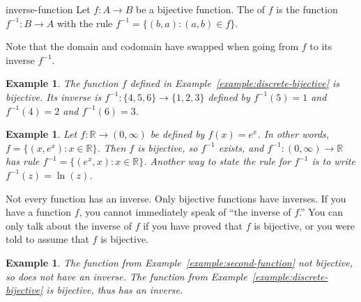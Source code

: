 \documentclass{book}
\newcounter{ekcounter}%
\theoremstyle{ekimcustom}
\newtheorem{example}[ekcounter]{Example}
\newcommand\defn[1]{{\color{blue}{\bf #1}}}
\begin{document}
\begin{bdefinition}{}{inverse-function}
Let $f : A \to B$ be a bijective function. The \defn{inverse function} of $f$ is the function $f^{-1} : B \to A$ with the rule $f^{-1} = \{(b,a) : (a,b) \in f\}$.
\end{bdefinition}
Note that the domain and codomain have swapped when going from $f$ to its inverse $f^{-1}$.

\begin{example}
The function $f$ defined in Example~\ref{example:discrete-bijective} is bijective. Its inverse is $f^{-1} : \{4,5,6\} \to \{1,2,3\}$ defined by $f^{-1}(5)=1$ and $f^{-1}(4)=2$ and $f^{-1}(6)=3$.
\end{example}
\begin{example}
Let $f : \mathbb{R} \to (0,\infty)$ be defined by $f(x) = e^x$. 
In other words, $f = \{(x,e^x) : x \in \mathbb{R}\}$.
Then $f$ is bijective, so $f^{-1}$ exists, and $f^{-1} : (0,\infty) \to \mathbb{R}$ has rule $f^{-1} = \{(e^x,x) : x \in \mathbb{R}\}$. Another way to state the rule for $f^{-1}$ is to write $f^{-1}(z) = \ln(z)$.
\end{example}


\begin{bwarning}{}{}
Not every function has an inverse. Only bijective functions have inverses. If you have a function $f$, you cannot immediately speak of ``the inverse of $f$.'' You can only talk about the inverse of $f$ if you have proved that $f$ is bijective, or you were told to assume that $f$ is bijective.
\end{bwarning}
\begin{example}
The function from Example~\ref{example:second-function} not bijective, so does not have an inverse.
The function from Example~\ref{example:discrete-bijective} is bijective, thus has an inverse.
\end{example}
\end{document}
